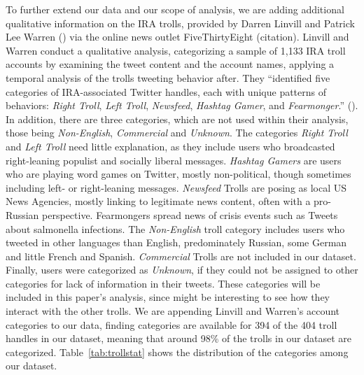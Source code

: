 \documentclass[12pt, titlepage=true, toc=bib]{scrartcl}
\begin{document}
To further extend our data and our scope of analysis, we are adding additional qualitative information on the IRA trolls, provided by Darren Linvill and Patrick Lee Warren (\cite*{linvill_troll_2018}) via the online news outlet FiveThirtyEight (citation). Linvill and Warren conduct a qualitative analysis, categorizing a sample of 1,133 IRA troll accounts by examining the tweet content and the account names, applying a temporal analysis of the trolls tweeting behavior after. They ``identified five categories of IRA-associated Twitter handles, each with unique patterns of behaviors: \textit{Right Troll}, \textit{Left Troll}, \textit{Newsfeed}, \textit{Hashtag Gamer}, and \textit{Fearmonger}.'' (\cite[6]{linvill_troll_2018}). In addition, there are three categories, which are not used within their analysis, those being \textit{Non-English}, \textit{Commercial} and \textit{Unknown}. The categories \textit{Right Troll} and \textit{Left Troll} need little explanation, as they include users who broadcasted right-leaning populist and socially liberal messages. \textit{Hashtag Gamers} are users who are playing word games on Twitter, mostly non-political, though sometimes including left- or right-leaning messages. \textit{Newsfeed} Trolls are posing as local US News Agencies, mostly linking to legitimate news content, often with a pro-Russian perspective. Fearmongers spread news of crisis events such as Tweets about salmonella infections. The \textit{Non-English} troll category includes users who tweeted in other languages than English, predominately Russian, some German and little French and Spanish. \textit{Commercial} Trolls are not included in our dataset. Finally, users were categorized as \textit{Unknown}, if they could not be assigned to other categories for lack of information in their tweets. These categories will be included in this paper's analysis, since might be interesting to see how they interact with the other trolls. We are appending Linvill and Warren's account categories to our data, finding categories are available for 394 of the 404 troll handles in our dataset, meaning that around 98\% of the trolls in our dataset are categorized. Table~\ref{tab:trollstat} shows the distribution of the categories among our dataset.
\end{document}

